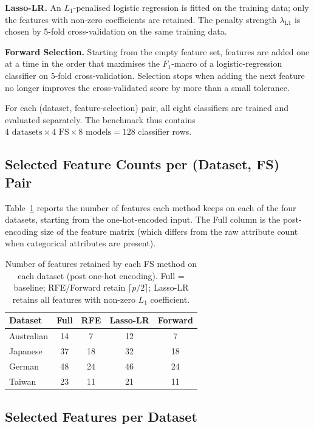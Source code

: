 \textbf{Lasso-LR.} An $L_1$-penalised logistic regression
 is fitted on the training data; only
the features with non-zero coefficients are retained. The penalty
strength $\lambda_{\mathrm{L}1}$ is chosen by 5-fold cross-validation
on the same training data.

\textbf{Forward Selection.} Starting from the empty feature set,
features are added one at a time in the order that maximises the
$F_1$-macro of a logistic-regression classifier on 5-fold
cross-validation. Selection stops when adding the next feature no
longer improves the cross-validated score by more than a small
tolerance.

For each (dataset, feature-selection) pair, all eight classifiers
are trained and evaluated separately. The benchmark thus contains
$4\text{ datasets}\times 4\text{ FS}\times 8\text{ models}=128$
classifier rows.

\subsection{Selected Feature Counts per (Dataset, FS) Pair}
\label{sec:selected-features}

Table~\ref{tab:fs-counts} reports the number of features each method
keeps on each of the four datasets, starting from the one-hot-encoded
input.  The Full column is the post-encoding size of the feature
matrix (which differs from the raw attribute count when categorical
attributes are present).

\begin{table}[H]
\centering
\caption{Number of features retained by each FS method on each dataset
(post one-hot encoding).  Full = baseline; RFE/Forward retain
$\lceil p/2\rceil$; Lasso-LR retains all features with non-zero
$L_1$ coefficient.}
\singlespacing
\label{tab:fs-counts}
\small
\begin{tabular}{l c c c c}
\toprule
\textbf{Dataset} & \textbf{Full} & \textbf{RFE} & \textbf{Lasso-LR} & \textbf{Forward}\\
\midrule
Australian & 14 & \phantom{0}7 & 12 & \phantom{0}7\\
Japanese   & 37 & 18 & 32 & 18\\
German     & 48 & 24 & 46 & 24\\
Taiwan     & 23 & 11 & 21 & 11\\
\bottomrule
\end{tabular}
\end{table}
\subsection{Selected Features per Dataset}
\label{sec:fs-features}

